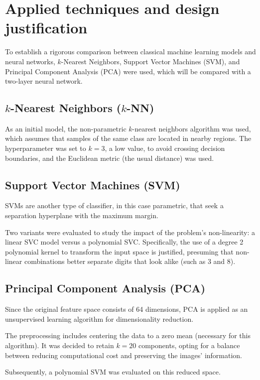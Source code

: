 \documentclass[11pt,a4paper]{article}
\begin{document}
\section{Applied techniques and design justification}
To establish a rigorous comparison between classical machine learning models and neural networks, $k$-Nearest Neighbors, Support Vector Machines (SVM), and Principal Component Analysis (PCA) were used, which will be compared with a two-layer neural network.

\subsection{$k$-Nearest Neighbors ($k$-NN)}
As an initial model, the non-parametric $k$-nearest neighbors algorithm was used, which assumes that samples of the same class are located in nearby regions. The hyperparameter was set to $k=3$, a low value, to avoid crossing decision boundaries, and the Euclidean metric (the usual distance) was used.

\subsection{Support Vector Machines (SVM)}
SVMs are another type of classifier, in this case parametric, that seek a separation hyperplane with the maximum margin.

Two variants were evaluated to study the impact of the problem's non-linearity: a linear SVC model versus a polynomial SVC. Specifically, the use of a degree 2 polynomial kernel to transform the input space is justified, presuming that non-linear combinations better separate digits that look alike (such as 3 and 8).

\subsection{Principal Component Analysis (PCA)}
Since the original feature space consists of 64 dimensions, PCA is applied as an unsupervised learning algorithm for dimensionality reduction.

The preprocessing includes centering the data to a zero mean (necessary for this algorithm). It was decided to retain $k = 20$ components, opting for a balance between reducing computational cost and preserving the images' information.

Subsequently, a polynomial SVM was evaluated on this reduced space.
\end{document}
